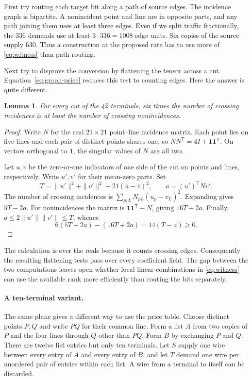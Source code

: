 \documentclass[11pt]{article}
\newtheorem{lemma}[theorem]{Lemma}
\theoremstyle{definition}
\newcommand{\one}{\mathbf 1}
\begin{document}
First try routing each target bit along a path of source edges. The
incidence graph is bipartite. A nonincident point and line are in opposite
parts, and any path joining them uses at least three edges. Even if we
split traffic fractionally, the 336 demands use at least \(3\cdot336=1008\)
edge units. Six copies of the source supply 630. Thus a construction at
the proposed rate has to use more of \eqref{eq:witness} than path routing.

Next try to disprove the conversion by flattening the tensor across a cut.
Equation~\eqref{eq:graph-price} reduces this test to counting edges. Here
the answer is quite different.

\begin{lemma}\label{lem:cuts}
For every cut of the 42 terminals, six times the number of crossing
incidences is at least the number of crossing nonincidences.
\end{lemma}
\begin{proof}
Write \(N\) for the real \(21\times21\) point--line incidence matrix.
Each point lies on five lines and each pair of distinct points shares one,
so \(NN^{\mathsf T}=4I+\one\one^{\mathsf T}\). On vectors orthogonal to
\(\one\), the singular values of \(N\) are all two.

Let \(u,v\) be the zero-or-one indicators of one side of the cut on
points and lines, respectively. Write \(u',v'\) for their mean-zero parts.
Set
\[
  T=\|u'\|^2+\|v'\|^2+21(\bar u-\bar v)^2,\qquad
  a=(u')^{\mathsf T}Nv'.
\]
The number of crossing incidences is \(\sum_{p,L}N_{pL}(u_p-v_L)^2\).
Expanding gives \(5T-2a\). For nonincidences the matrix is
\(\one\one^{\mathsf T}-N\), giving \(16T+2a\). Finally,
\(a\le2\|u'\|\|v'\|\le T\), whence
\[
                    6(5T-2a)-(16T+2a)=14(T-a)\ge0 .
\]
\end{proof}

The calculation is over the reals because it counts crossing edges.
Consequently the resulting flattening tests pass over every coefficient
field. The gap between the two computations leaves open whether local
linear combinations in \eqref{eq:witness} can use the available rank more
efficiently than routing the bits separately.

\paragraph{A ten-terminal variant.}
The same plane gives a different way to use the price table. Choose
distinct points \(P,Q\) and write \(PQ\) for their common line.
Form a list \(A\) from two copies of \(P\) and
the four lines through \(Q\) other than \(PQ\). Form \(B\) by exchanging
\(P\) and \(Q\). There are twelve list entries but only ten terminals.
Let \(S\) supply one wire between every entry of \(A\) and every entry of
\(B\), and let \(T\) demand one wire per unordered pair of entries within
each list. A wire from a terminal to itself can be discarded.
\end{document}
